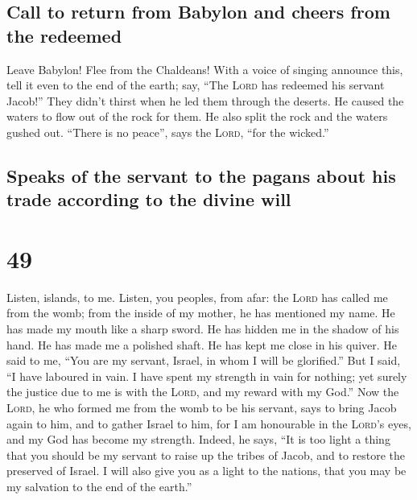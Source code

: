 \hypertarget{call-to-return-from-babylon-and-cheers-from-the-redeemed}{%
\subsection{Call to return from Babylon and cheers from the
redeemed}\label{call-to-return-from-babylon-and-cheers-from-the-redeemed}}

 Leave Babylon! Flee from the Chaldeans! With a voice of
singing announce this, tell it even to the end of the earth; say, ``The
\textsc{Lord} has redeemed his servant Jacob!''  They
didn't thirst when he led them through the deserts. He caused the waters
to flow out of the rock for them. He also split the rock and the waters
gushed out.  ``There is no peace'', says the
\textsc{Lord}, ``for the wicked.''

\hypertarget{speaks-of-the-servant-to-the-pagans-about-his-trade-according-to-the-divine-will}{%
\subsection{Speaks of the servant to the pagans about his trade
according to the divine
will}\label{speaks-of-the-servant-to-the-pagans-about-his-trade-according-to-the-divine-will}}

\hypertarget{section-48}{%
\section{49}\label{section-48}}

 Listen, islands, to me. Listen, you peoples, from afar:
the \textsc{Lord} has called me from the womb; from the inside of my
mother, he has mentioned my name.  He has made my mouth
like a sharp sword. He has hidden me in the shadow of his hand. He has
made me a polished shaft. He has kept me close in his quiver.
 He said to me, ``You are my servant, Israel, in whom I
will be glorified.''  But I said, ``I have laboured in
vain. I have spent my strength in vain for nothing; yet surely the
justice due to me is with the \textsc{Lord}, and my reward with my
God.''  Now the \textsc{Lord}, he who formed me from the
womb to be his servant, says to bring Jacob again to him, and to gather
Israel to him, for I am honourable in the \textsc{Lord}'s eyes, and my
God has become my strength.  Indeed, he says, ``It is too
light a thing that you should be my servant to raise up the tribes of
Jacob, and to restore the preserved of Israel. I will also give you as a
light to the nations, that you may be my salvation to the end of the
earth.''

